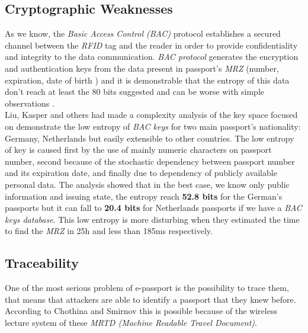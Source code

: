 \documentclass{acm_proc_article-sp}
\begin{document}
\subsection{Cryptographic Weaknesses}
\label{subsec:crypt}
As we know, the \textit{Basic Access Control (BAC)} protocol establishes a secured channel between 
the \textit{RFID} tag and the reader in order to provide confidentiality and integrity to the 
data communication. \textit{BAC protocol} generates the encryption and authentication keys from the data 
present in passport's \textit {MRZ} (number, expiration, date of birth ) and it is demonstrable 
that the entropy of this data don’t reach at least the 80 bits suggested and can be worse 
with simple observations \cite{JUAR2005} \cite{02COPA}.\\
Liu, Kasper and others \cite{02COPA} had made a complexity analysis of the key space focused on 
demonstrate the low entropy of \textit{BAC keys} for two main passport’s nationality: Germany, 
Netherlands but easily extensible to other countries. The low entropy of key is caused 
first by the use of mainly numeric characters on passport number, 
second because of the stochastic dependency between passport number and its expiration 
date, and finally due to dependency of publicly available personal data. The analysis 
showed that in the best case, we know only public information and issuing state, the 
entropy reach \textbf {52.8 bits} for the German’s passports but it can fall to \textbf {20.4 bits} for 
Netherlands passports if we have a \textit{BAC keys database}. This low entropy is more disturbing 
when they estimated the time to find the \textit{MRZ} in 25h and less than 185ms 
respectively.

\subsection{Traceability}
\label{subsec:trace}

One of the most serious problem of e-passport is the possibility to trace them, that means that  
attackers are able to identify a passport that they knew before. According to Chothina and Smirnov 
\cite{CHTOM2010} this is possible because of the wireless lecture system of these 
\textit{MRTD (Machine Readable Travel Document)}.
\end{document}
